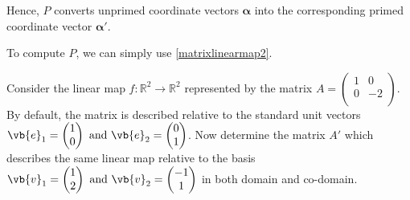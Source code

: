 \documentclass[a4paper,12pt]{report}
\begin{document}
Hence, \(P \) converts unprimed coordinate vectors \(\boldsymbol{\alpha } \) into the corresponding primed coordinate vector \(\boldsymbol{\alpha '} \). 

To compute \(P\), we can simply use \cref{matrixlinearmap2}.

{Consider the linear map \(f: \mathbb{R}^2 \rightarrow \mathbb{R}^2\) represented by the matrix    \(A = \begin{pmatrix}
        1 &  0 \\
        0 &  -2 \\
    \end{pmatrix}\). By default, the matrix is described relative to the standard unit vectors \(\vb{e} _{1} = \begin{pmatrix}
     1 \\
     0 \\
\end{pmatrix} \text { and } \vb{e} _{2} = \begin{pmatrix}
     0 \\
     1 \\
\end{pmatrix}  \). Now determine the matrix \(A'\) which describes the same linear map relative to the basis \(\vb{v} _{1} = \begin{pmatrix}
     1 \\
     2 \\
\end{pmatrix} \text { and }  \vb{v} _{2} = \begin{pmatrix}
     -1 \\
     1 \\
\end{pmatrix}    \) in both domain and co-domain.}
\end{document}
